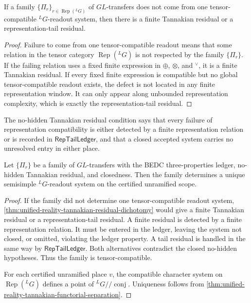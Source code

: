 \begin{theorem}
\label{thm:unified-reality-tannakian-residual-dichotomy}
If a family $\{\Pi_r\}_{r\in\operatorname{Rep}({}^LG)}$ of
$GL$-transfers does not come from one tensor-compatible
${}^LG$-readout system, then there is a finite Tannakian residual or a
representation-tail residual.
\end{theorem}
\begin{proof}
Failure to come from one tensor-compatible readout means that some
relation in the tensor category $\operatorname{Rep}({}^LG)$ is not
respected by the family $\{\Pi_r\}$. If the failing relation uses a
fixed finite expression in $\oplus$, $\otimes$, and ${}^\vee$, it is a
finite Tannakian residual. If every fixed finite expression is
compatible but no global tensor-compatible readout exists, the defect is
not located in any finite representation window. It can only appear
along unbounded representation complexity, which is exactly the
representation-tail residual.
\end{proof}

\begin{definition}
\label{def:unified-reality-no-hidden-tannakian-residual}
The no-hidden Tannakian residual condition says that every failure of
representation compatibility is either detected by a finite
representation relation or is recorded in $\mathsf{RepTailLedger}$, and
that a closed accepted system carries no unresolved entry in either
place.
\end{definition}

\begin{theorem}
\label{thm:unified-reality-tannakian-closure}
Let $\{\Pi_r\}$ be a family of $GL$-transfers with the BEDC
three-properties ledger, no-hidden Tannakian residual, and closedness.
Then the family determines a unique semisimple ${}^LG$-readout system on
the certified unramified scope.
\end{theorem}
\begin{proof}
If the family did not determine one tensor-compatible readout system,
\autoref{thm:unified-reality-tannakian-residual-dichotomy} would give a
finite Tannakian residual or a representation-tail residual. A finite
residual is detected by a finite representation relation. It must be
entered in the ledger, leaving the system not closed, or omitted,
violating the ledger property. A tail residual is handled in the same
way by $\mathsf{RepTailLedger}$. Both alternatives contradict the
closed no-hidden hypotheses. Thus the family is tensor-compatible.

For each certified unramified place $v$, the compatible character
system on $\operatorname{Rep}({}^LG)$ defines a point of
${}^LG/\!/\operatorname{conj}$. Uniqueness follows from
\autoref{thm:unified-reality-tannakian-functorial-separation}.
\end{proof}


